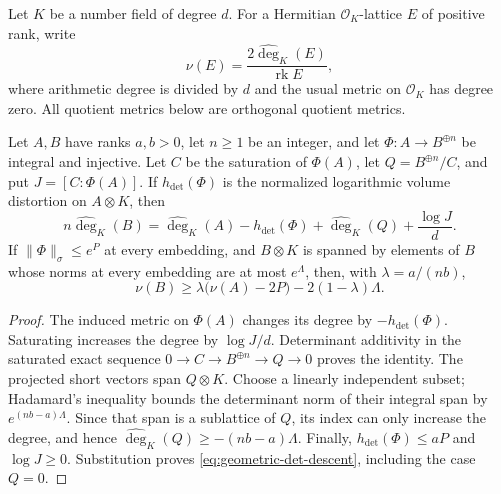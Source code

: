 Let $K$ be a number field of degree $d$. For a Hermitian
$\mathcal O_K$-lattice $E$ of positive rank, write
\[
 \nu(E)=\frac{2\widehat{\deg}_K(E)}{\operatorname{rk}E},
\]
where arithmetic degree is divided by $d$ and the usual metric on
$\mathcal O_K$ has degree zero. All quotient metrics below are orthogonal
quotient metrics.

\begin{proposition}\label{prop:geometric-det-descent}
Let $A,B$ have ranks $a,b>0$, let $n\ge1$ be an integer, and let
$\Phi:A\longrightarrow B^{\oplus n}$ be integral and injective.
Let $C$ be the saturation of $\Phi(A)$, let $Q=B^{\oplus n}/C$, and
put $J=[C:\Phi(A)]$. If $h_{\det}(\Phi)$ is the normalized logarithmic
volume distortion on $A\otimes K$, then
\[
 n\widehat{\deg}_K(B)=\widehat{\deg}_K(A)-h_{\det}(\Phi)
       +\widehat{\deg}_K(Q)+\frac{\log J}{d}.
\]
If $\|\Phi\|_\sigma\le e^P$ at every embedding, and $B\otimes K$
is spanned by elements of $B$ whose norms at every embedding are at most
$e^\Lambda$, then, with $\lambda=a/(nb)$,
\begin{equation}\label{eq:geometric-det-descent}
 \nu(B)\ge\lambda\bigl(\nu(A)-2P\bigr)
                -2(1-\lambda)\Lambda.
\end{equation}
\end{proposition}
\begin{proof}
The induced metric on $\Phi(A)$ changes its degree by
$-h_{\det}(\Phi)$. Saturating increases the degree by $\log J/d$.
Determinant additivity in the saturated exact sequence
$0\to C\to B^{\oplus n}\to Q\to0$ proves the identity.
The projected short vectors span $Q\otimes K$. Choose a linearly
independent subset; Hadamard's inequality bounds the determinant norm
of their integral span by $e^{(nb-a)\Lambda}$. Since that span is a
sublattice of $Q$, its index can only increase the degree, and hence
$\widehat{\deg}_K(Q)\ge-(nb-a)\Lambda$. Finally,
$h_{\det}(\Phi)\le aP$ and $\log J\ge0$. Substitution proves
\eqref{eq:geometric-det-descent}, including the case $Q=0$.
\end{proof}

